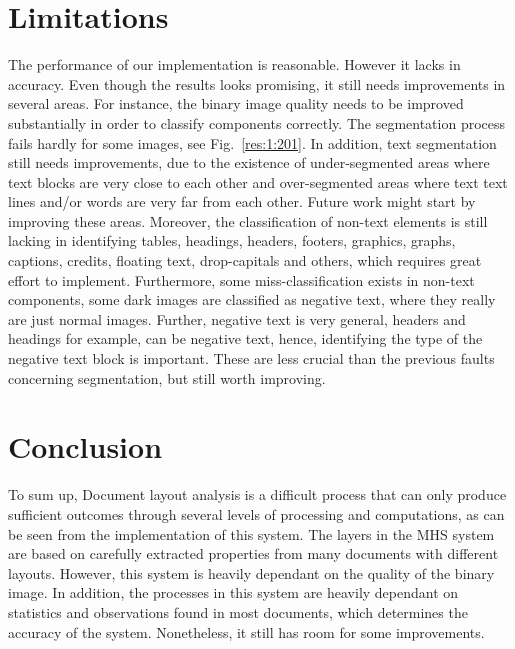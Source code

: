 \documentclass[conference]{IEEEtran}
\begin{document}
    \section{Limitations}\label{sect:4}
    
    The performance of our implementation is reasonable.
    However it lacks in accuracy.
    Even though the results looks promising, it still needs improvements in several areas.
    For instance, the binary image quality needs to be improved substantially in order
    to classify components correctly.
    The segmentation process fails hardly for some images, see Fig.~\ref{res:1:201}.
    In addition, text segmentation still needs improvements, due to the existence of
    under-segmented areas where text blocks are very close to each other and
    over-segmented areas where text text lines and/or words are very far from each other.
    Future work might start by improving these areas.
    Moreover, the classification of non-text elements is still lacking in identifying
    tables, headings, headers, footers, graphics, graphs, captions, credits, floating text, drop-capitals
    and others, which requires great effort to implement.
    Furthermore, some miss-classification exists in non-text components, some dark images are classified as
    negative text, where they really are just normal images.
    Further, negative text is very general, headers and headings for example, can be negative text, hence,
    identifying the type of the negative text block is important.
    These are less crucial than the previous faults concerning segmentation, but still worth improving.

    \section{Conclusion}\label{sect:5}

    To sum up, Document layout analysis is a difficult process that can only produce sufficient outcomes through several
    levels of processing and computations, as can be seen from the implementation of this system.
    The layers in the MHS system are based on carefully extracted properties from many documents with different layouts.
    However, this system is heavily dependant on the quality of the binary image.
    In addition, the processes in this system are heavily dependant on statistics and observations found in most
    documents, which determines the accuracy of the system.
    Nonetheless, it still has room for some improvements.

    
    
\end{document}
